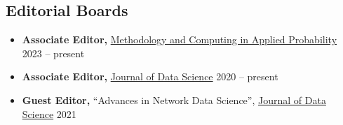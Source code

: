\documentclass[12pt]{article}
\begin{document}
	\subsection*{Editorial Boards}
	\begin{itemize}
		\item \textbf{Associate Editor,}
		\href{https://www.springer.com/journal/11009/}{Methodology 
		and Computing in Applied Probability} \hfill 2023 -- present
		\item \textbf{Associate Editor,} 
		\href{https://jds-online.org/journal/JDS}{Journal of Data Science} \hfill 2020 -- present
		\item \textbf{Guest Editor,} ``Advances in Network Data 
		Science'', \href{https://jds-online.org/journal/JDS}{Journal of Data Science} \hfill 2021
	\end{itemize}
\end{document}
